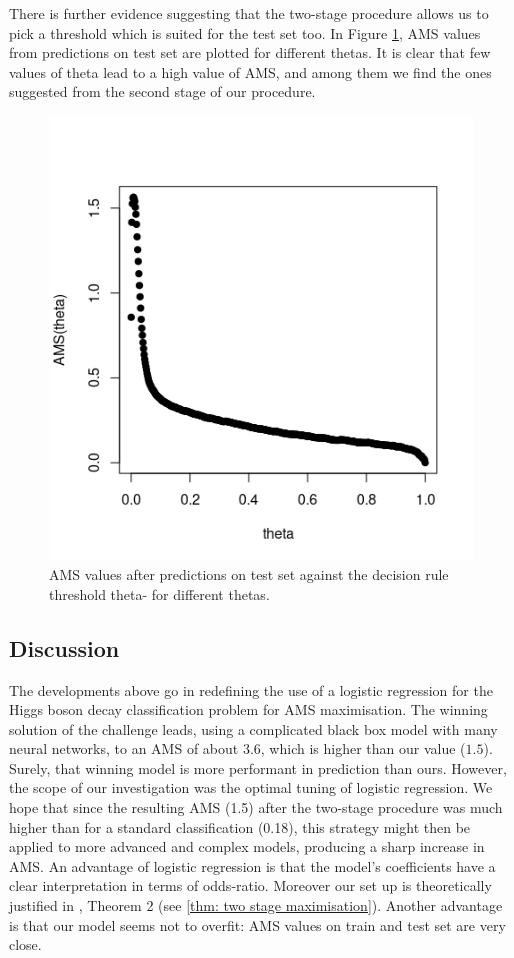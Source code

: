 \documentclass[]{article}
\begin{document}
There is further evidence suggesting that the two-stage procedure allows us to pick a threshold which is suited for the test set too. In Figure \ref{fig: AMS on test}, AMS values from predictions on test set are plotted for different thetas. It is clear that few values of theta lead to a high value of AMS, and among them we find the ones suggested from the second stage of our procedure. 

\begin{figure}[H]
\centering
\includegraphics[scale=0.7]{../Pictures/testbadpractice.png}
\caption{AMS values after predictions on test set against the decision rule threshold theta- for different thetas.}
\label{fig: AMS on test}
\end{figure}

\subsection{Discussion}

The developments above go in redefining the use of a logistic regression for the Higgs boson decay classification problem for AMS maximisation. The winning solution of the challenge leads, using a complicated black box model with many neural networks, to an AMS of about $3.6$, which is higher than our value ($1.5$). Surely, that winning model is more performant in prediction than ours. However, the scope of our investigation was the optimal tuning of logistic regression. We hope that since the resulting AMS (1.5) after the two-stage procedure was much higher than for a standard classification (0.18), this strategy might then be applied to more advanced and complex models, producing a sharp increase in AMS. An advantage of logistic regression is that the model's coefficients have a clear interpretation in terms of odds-ratio. Moreover our set up is theoretically justified in \cite{kotlowski2014consistent}, Theorem 2 (see \ref{thm: two stage maximisation}). Another advantage is that our model seems not to overfit: AMS values on train and test set are very close.




\end{document}
